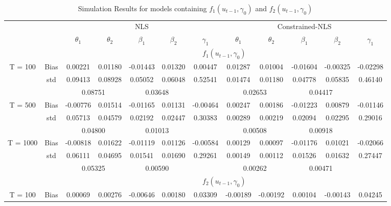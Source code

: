 \documentclass[a4paper,12pt,times,numbered,print,index]{report}
\numberwithin{equation}{section}
\begin{document}
	
	\begin{table}[htbp]
		\centering
		\caption{Simulation Results for models containing $f_1 (u_{t-1}, \gamma_0)$ and $f_2 (u_{t-1}, \gamma_0)$}
		\begin{adjustbox}{max width=\textwidth}
			\begin{tabular}{cccccccccccc}
				\toprule
				&       & \multicolumn{5}{c}{NLS}               & \multicolumn{5}{c}{Constrained-NLS} \\
				&       & $\theta_1$ & $\theta_2$ & $\beta_1$ & $\beta_2$ & $\gamma_1$ & $\theta_1$ & $\theta_2$ & $\beta_1$ & $\beta_2$ & $\gamma_1$ \\
				\midrule
				&       & \multicolumn{10}{c}{$f_1 (u_{t-1}, \gamma_0)$}                \\
				\midrule
				\multirow{3}[1]{*}{T = 100} & Bias  & 0.00221 & 0.01180 & -0.01443 & 0.01320 & 0.00447 & 0.01287 & 0.01004 & -0.01604 & -0.00325 & -0.02298 \\
				& std   & 0.09413 & 0.08928 & 0.05052 & 0.06048 & 0.52541 & 0.01474 & 0.01180 & 0.04778 & 0.05835 & 0.46140 \\
				&       & \multicolumn{2}{c}{0.08751} & \multicolumn{2}{c}{0.03648} &       & \multicolumn{2}{c}{0.02653} & \multicolumn{2}{c}{0.04417} &  \\
				\multirow{3}[0]{*}{T = 500} & Bias  & -0.00776 & 0.01514 & -0.01165 & 0.01131 & -0.00464 & 0.00247 & 0.00186 & -0.01223 & 0.00879 & -0.01146 \\
				& std   & 0.05713 & 0.04579 & 0.02192 & 0.02447 & 0.30383 & 0.00289 & 0.00219 & 0.02094 & 0.02295 & 0.29016 \\
				&       & \multicolumn{2}{c}{0.04800} & \multicolumn{2}{c}{0.01013} &       & \multicolumn{2}{c}{0.00508} & \multicolumn{2}{c}{0.00918} &  \\
				\multirow{3}[1]{*}{T = 1000} & Bias  & -0.00818 & 0.01622 & -0.01119 & 0.01126 & -0.00584 & 0.00129 & 0.00097 & -0.01176 & 0.01021 & -0.02066 \\
				& std   & 0.06111 & 0.04695 & 0.01541 & 0.01690 & 0.29261 & 0.00149 & 0.00112 & 0.01526 & 0.01632 & 0.27447 \\
				&       & \multicolumn{2}{c}{0.05325} & \multicolumn{2}{c}{0.00590} &       & \multicolumn{2}{c}{0.00262} & \multicolumn{2}{c}{0.00471} &  \\
				\midrule
				&       & \multicolumn{10}{c}{$f_2 (u_{t-1}, \gamma_0)$}                \\
				\midrule
				\multirow{3}[1]{*}{T = 100} & Bias  & 0.00069 & 0.00276 & -0.00646 & 0.00180 & 0.03309 & -0.00189 & -0.00192 & 0.00104 & -0.00143 & 0.04245 \\

\end{tabular}
\end{adjustbox}
\end{table}
\end{document}
